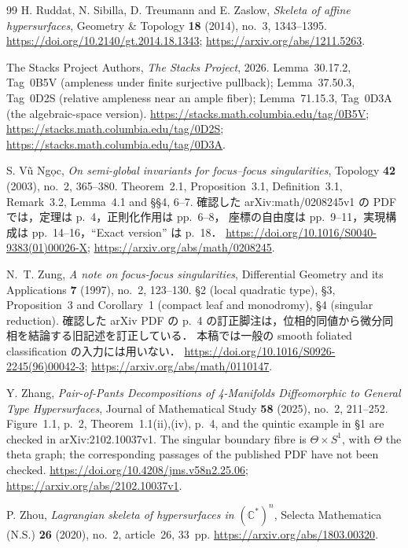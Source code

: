 \begin{thebibliography}{99}
H. Ruddat, N. Sibilla, D. Treumann and E. Zaslow,
\emph{Skeleta of affine hypersurfaces},
Geometry \& Topology \textbf{18} (2014), no.~3, 1343--1395.
\url{https://doi.org/10.2140/gt.2014.18.1343};
\url{https://arxiv.org/abs/1211.5263}.

The Stacks Project Authors,
\emph{The Stacks Project}, 2026.
Lemma~30.17.2, Tag~0B5V (ampleness under finite surjective pullback);
Lemma~37.50.3, Tag~0D2S (relative ampleness near an ample fiber);
Lemma~71.15.3, Tag~0D3A (the algebraic-space version).
\url{https://stacks.math.columbia.edu/tag/0B5V};
\url{https://stacks.math.columbia.edu/tag/0D2S};
\url{https://stacks.math.columbia.edu/tag/0D3A}.

S. Vũ Ngọc,
\emph{On semi-global invariants for focus--focus singularities},
Topology \textbf{42} (2003), no.~2, 365--380.
Theorem~2.1, Proposition~3.1, Definition~3.1, Remark~3.2,
Lemma~4.1 and \S\S4, 6--7.
確認した arXiv:math/0208245v1 の PDF では，定理は p.~4，正則化作用は pp.~6--8，
座標の自由度は pp.~9--11，実現構成は pp.~14--16，``Exact version'' は p.~18．
\url{https://doi.org/10.1016/S0040-9383(01)00026-X};
\url{https://arxiv.org/abs/math/0208245}.

N.~T. Zung,
\emph{A note on focus-focus singularities},
Differential Geometry and its Applications \textbf{7} (1997), no.~2, 123--130.
\S2 (local quadratic type), \S3, Proposition~3 and Corollary~1 (compact leaf and monodromy),
\S4 (singular reduction).
確認した arXiv PDF の p.~4 の訂正脚注は，位相的同値から微分同相を結論する旧記述を訂正している．
本稿では一般の smooth foliated classification の入力には用いない．
\url{https://doi.org/10.1016/S0926-2245(96)00042-3};
\url{https://arxiv.org/abs/math/0110147}.

Y. Zhang,
\emph{Pair-of-Pants Decompositions of 4-Manifolds Diffeomorphic to General Type Hypersurfaces},
Journal of Mathematical Study \textbf{58} (2025), no.~2, 211--252.
Figure~1.1, p.~2, Theorem~1.1(ii),(iv), p.~4,
and the quintic example in \S1 are checked in arXiv:2102.10037v1.
The singular boundary fibre is $\Theta\times S^1$, with $\Theta$ the theta graph;
the corresponding passages of the published PDF have not been checked.
\url{https://doi.org/10.4208/jms.v58n2.25.06};
\url{https://arxiv.org/abs/2102.10037v1}.

P. Zhou,
\emph{Lagrangian skeleta of hypersurfaces in $(\mathbb C^*)^n$},
Selecta Mathematica (N.S.) \textbf{26} (2020), no.~2, article~26, 33~pp.
\url{https://arxiv.org/abs/1803.00320}.


\end{thebibliography}
